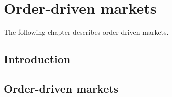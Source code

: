 \chapter{Order-driven markets}
\label{chap.orderDrivenMarkets}

The following chapter describes order-driven markets.

\section{Introduction}
\label{sec.introOrderDrivenMarkets}


\section{Order-driven markets}
\label{sec.orderDrivenMarkets}

